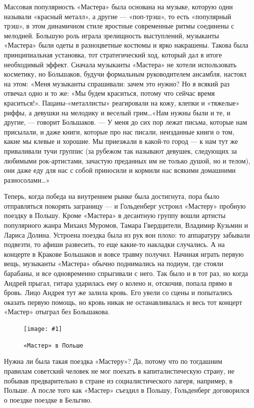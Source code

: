 \documentclass[10pt, twoside]{book}
\newcommand{\myincludegraphics}[1]{\texttt{[image: \#1]}}
\begin{document}
Массовая популярность «Мастера» была основана на музыке, которую одни называли «красный металл», а другие — «поп-трэш»,
то есть «популярный трэш», в этом динамичном стиле яростные современные ритмы соединены с мелодией. Большую роль играла
зрелищность выступлений, музыканты «Мастера» были одеты в разноцветные костюмы и ярко накрашены. Такова была
принципиальная установка, тот стратегический ход, который дал в итоге необходимый эффект. Сначала музыканты «Мастера» не
хотели использовать косметику, но Большаков, будучи формальным руководителем ансамбля, настоял на этом: «Меня музыканты
спрашивали: зачем это нужно? Но я всякий раз отвечал одно и то же: «Мы будем краситься, потому что сейчас время
краситься!». Пацаны-«металлисты» реагировали на кожу, клепки и «тяжелые» риффы, а девушки на мелодику и веселый
грим\ldots «Нам нужны были и те, и другие, — говорит Большаков. — У меня до сих пор лежат письма, которые нам присылали,
и даже книги, которые про нас писали, неизданные книги о том, какие мы клевые и хорошие. Мы приезжали в какой-то город —
к нам тут же приваливали тучи группис (за рубежом так называют девушек, следующих за любимыми рок-артистами, зачастую
преданных им не только душой, но и телом), они даже еду для нас с собой приносили и кормили нас всякими домашними
разносолами\ldots»

Теперь, когда победа на внутреннем рынке была достигнута, пора было отправляться покорять заграницу — и Гольденберг
устроил «Мастеру» пробную поездку в Польшу. Кроме «Мастера» в десантную группу вошли артисты популярного жанра Михаил
Муромов, Тамара Гвердцители, Владимир Кузьмин и Лариса Долина. Устроена поездка была из рук вон плохо: то аппаратуру
забывали подвезти, то афиши развесить, то еще какие-то накладки случались. А на концерте в Кракове Большаков и вовсе
травму получил. Начиная играть первую вещь, музыканты «Мастера» обычно поднимались на подиум, где стояли барабаны, и все
одновременно спрыгивали с него. Так было и в тот раз, но когда Андрей прыгал, гитара ударилась ему о колено и, отскочив,
попала прямо в бровь. Лицо Андрея тут же залила кровь. Его увели со сцены и попытались оказать первую помощь, но кровь
никак не останавливалась и весь тот концерт «Мастер» отыграл без Большакова.

\begin{figure}[h]
    \centering
    \myincludegraphics{Image22}
    \caption{\texttt{«Мастер» в Польше}}
\end{figure}

Нужна ли была такая поездка «Мастеру»? Да, потому что по тогдашним правилам советский человек не мог поехать в
капиталистическую страну, не побывав предварительно в стране из социалистического лагеря, например, в Польше. А после
того как «Мастер» съездил в Польшу, Гольденберг договорился о поездке поездке в Бельгию.
\end{document}
